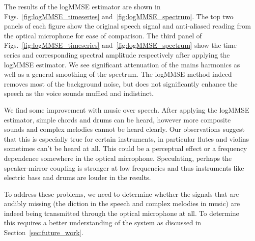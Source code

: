 \documentclass[paper-main.tex]{subfiles}
\begin{document}
 



The results of the logMMSE estimator are shown in Figs.~\ref{fig:logMMSE_timeseries} and~\ref{fig:logMMSE_spectrum}. The top two panels of each figure show the original speech signal and anti-aliased reading from the optical microphone for ease of comparison. The third panel of Figs.~\ref{fig:logMMSE_timeseries} and~\ref{fig:logMMSE_spectrum} show the time series and corresponding spectral amplitude respectively after applying the logMMSE estimator. We see significant attenuation of the mains harmonics as well as a general smoothing of the spectrum. The logMMSE method indeed removes most of the background noise, but does not significantly enhance the speech as the voice sounds muffled and indistinct.


We find some improvement with music over speech. After applying the logMMSE estimator, simple chords and drums can be heard, however more composite sounds and complex melodies cannot be heard clearly. 
Our observations suggest that this is especially true for certain instruments, in particular flutes and violins sometimes can’t be heard at all. 
This could be a perceptual effect or a frequency dependence somewhere in the optical microphone.
Speculating, perhaps the speaker-mirror coupling is stronger at low frequencies and thus instruments like electric bass and drums are louder in the results.


To address these problems, we need to determine whether the signals that are audibly missing (the diction in the speech and complex melodies in music) are indeed being transmitted through the optical microphone at all. 
To determine this requires a better understanding of the system as discussed in Section~\ref{sec:future_work}.
\end{document}
